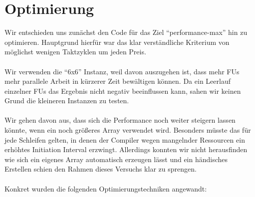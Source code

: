 \documentclass[oneside,11pt,accentcolor=tud2b, nochapname]{tudexercise}
\begin{document}
\section*{Optimierung}
Wir entschieden uns zunächst den Code für das Ziel "`performance-max"' hin zu optimieren.
Hauptgrund hierfür war das klar verständliche Kriterium von möglichst wenigen Taktzyklen um jeden Preis.\\
\\
Wir verwenden die "`6x6"' Instanz, weil davon auszugehen ist, dass mehr FUs mehr parallele Arbeit in kürzerer Zeit bewältigen können.
Da ein Leerlauf einzelner FUs das Ergebnis nicht negativ beeinflussen kann, sahen wir keinen Grund die kleineren Instanzen zu testen.\\
\\
Wir gehen davon aus, dass sich die Performance noch weiter steigern lassen könnte, wenn ein noch größeres Array verwendet wird.
Besonders müsste das für jede Schleifen gelten, in denen der Compiler wegen mangelnder Ressourcen ein erhöhtes Initiation Interval erzwingt.
Allerdings konnten wir nicht herausfinden wie sich ein eigenes Array automatisch erzeugen lässt und ein händisches Erstellen schien den Rahmen dieses Versuchs klar zu sprengen.\\
\\
Konkret wurden die folgenden Optimierungstechniken angewandt:
\end{document}
